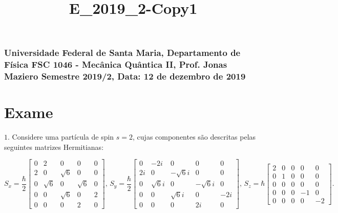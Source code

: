 \documentclass[11pt]{article}
\title{E\_2019\_2-Copy1}
\begin{document}
    
    
    \maketitle
    
    

    
    \subsubsection{\texorpdfstring{Universidade Federal de Santa Maria,
Departamento de Física FSC 1046 - Mecânica Quântica II, Prof. Jonas
Maziero Semestre 2019/2, Data: 12 de dezembro de
2019}{Universidade Federal de Santa Maria, Departamento de Física   FSC 1046 - Mecânica Quântica II, Prof. Jonas Maziero   Semestre 2019/2, Data: 12 de dezembro de 2019}}\label{universidade-federal-de-santa-maria-departamento-de-fuxedsica-fsc-1046---mecuxe2nica-quuxe2ntica-ii-prof.-jonas-maziero-semestre-20192-data-12-de-dezembro-de-2019}

\section{Exame}\label{exame}

    \(1.\) Considere uma partícula de spin \(s=2\), cujas componentes são
descritas pelas seguintes matrizes Hermitianas:

\begin{equation}
S_{x}=\frac{\hbar}{2}\begin{bmatrix} 0 & 2 & 0 & 0 & 0 \\ 2 & 0 & \sqrt{6} & 0 & 0 \\ 0 & \sqrt{6} & 0 & \sqrt{6} & 0 \\ 0 & 0 & \sqrt{6} & 0 & 2 \\ 0 & 0 & 0 & 2 & 0 \end{bmatrix} \text{, } S_{y}=\frac{\hbar}{2}\begin{bmatrix} 0 & -2i & 0 & 0 & 0 \\ 2i & 0 & -\sqrt{6}i & 0 & 0 \\ 0 & \sqrt{6}i & 0 & -\sqrt{6}i & 0 \\ 0 & 0 & \sqrt{6}i & 0 & -2i \\ 0 & 0 & 0 & 2i & 0 \end{bmatrix}\text{, } S_{z}=\hbar\begin{bmatrix} 2 & 0 & 0 & 0 & 0 \\ 0 & 1 & 0 & 0 & 0 \\ 0 & 0 & 0 & 0 & 0 \\ 0 & 0 & 0 & -1 & 0 \\ 0 & 0 & 0 & 0 & -2 \end{bmatrix}.
\end{equation}
\end{document}
